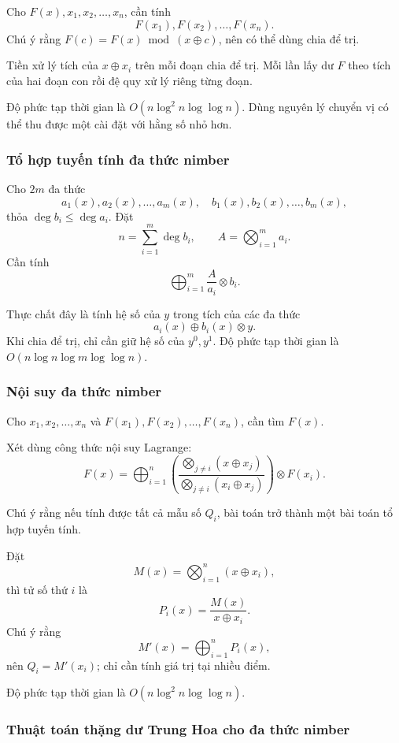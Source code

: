 \documentclass[11pt]{article}
\begin{document}
Cho \(F(x),x_1,x_2,\ldots,x_n\), cần tính
\[
  F(x_1),F(x_2),\ldots,F(x_n).
\]
Chú ý rằng \(F(c)=F(x)\bmod(x\oplus c)\), nên có thể dùng chia để trị.

Tiền xử lý tích của \(x\oplus x_i\) trên mỗi đoạn chia để trị. Mỗi lần lấy dư
\(F\) theo tích của hai đoạn con rồi đệ quy xử lý riêng từng đoạn.

Độ phức tạp thời gian là \(O(n\log^2 n\log\log n)\). Dùng nguyên lý chuyển vị có
thể thu được một cài đặt với hằng số nhỏ hơn.

\subsubsection{Tổ hợp tuyến tính đa thức nimber}

Cho \(2m\) đa thức
\[
  a_1(x),a_2(x),\ldots,a_m(x),\quad
  b_1(x),b_2(x),\ldots,b_m(x),
\]
thỏa \(\deg b_i\le \deg a_i\). Đặt
\[
  n=\sum_{i=1}^m\deg b_i,\qquad
  A=\bigotimes_{i=1}^m a_i.
\]
Cần tính
\[
  \bigoplus_{i=1}^m \frac{A}{a_i}\otimes b_i.
\]

Thực chất đây là tính hệ số của \(y\) trong tích của các đa thức
\[
  a_i(x)\oplus b_i(x)\otimes y.
\]
Khi chia để trị, chỉ cần giữ hệ số của \(y^0,y^1\). Độ phức tạp thời gian là
\(O(n\log n\log m\log\log n)\).

\subsubsection{Nội suy đa thức nimber}

Cho \(x_1,x_2,\ldots,x_n\) và \(F(x_1),F(x_2),\ldots,F(x_n)\), cần tìm \(F(x)\).

Xét dùng công thức nội suy Lagrange:
\[
  F(x)=\bigoplus_{i=1}^n
  \left(
  \frac{\bigotimes_{j\ne i}(x\oplus x_j)}
       {\bigotimes_{j\ne i}(x_i\oplus x_j)}
  \right)\otimes F(x_i).
\]

Chú ý rằng nếu tính được tất cả mẫu số \(Q_i\), bài toán trở thành một bài toán
tổ hợp tuyến tính.

Đặt
\[
  M(x)=\bigotimes_{i=1}^n (x\oplus x_i),
\]
thì tử số thứ \(i\) là
\[
  P_i(x)=\frac{M(x)}{x\oplus x_i}.
\]
Chú ý rằng
\[
  M'(x)=\bigoplus_{i=1}^n P_i(x),
\]
nên \(Q_i=M'(x_i)\); chỉ cần tính giá trị tại nhiều điểm.

Độ phức tạp thời gian là \(O(n\log^2 n\log\log n)\).

\subsubsection{Thuật toán thặng dư Trung Hoa cho đa thức nimber}
\end{document}
